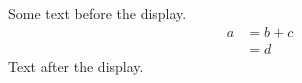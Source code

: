 \documentclass[12pt]{article}
\begin{document}
Some text before the display.
\begin{equation} \begin{split} a &= b + c \\ &= d \end{split} \end{equation}
Text after the display.
\end{document}
